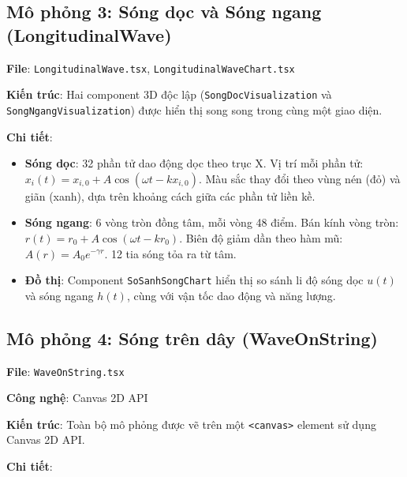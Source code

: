 \subsection{Mô phỏng 3: Sóng dọc và Sóng ngang (LongitudinalWave)}

\textbf{File}: \texttt{LongitudinalWave.tsx}, \texttt{LongitudinalWaveChart.tsx}

\textbf{Kiến trúc}: Hai component 3D độc lập (\texttt{SongDocVisualization} và \texttt{SongNgangVisualization}) được hiển thị song song trong cùng một giao diện.

\textbf{Chi tiết}:

\begin{itemize}
    \item \textbf{Sóng dọc}: 32 phần tử dao động dọc theo trục X. Vị trí mỗi phần tử: $x_i(t) = x_{i,0} + A\cos(\omega t - k x_{i,0})$. Màu sắc thay đổi theo vùng nén (đỏ) và giãn (xanh), dựa trên khoảng cách giữa các phần tử liền kề.
    
    \item \textbf{Sóng ngang}: 6 vòng tròn đồng tâm, mỗi vòng 48 điểm. Bán kính vòng tròn: $r(t) = r_0 + A\cos(\omega t - k r_0)$. Biên độ giảm dần theo hàm mũ: $A(r) = A_0 e^{-\gamma r}$. 12 tia sóng tỏa ra từ tâm.
    
    \item \textbf{Đồ thị}: Component \texttt{SoSanhSongChart} hiển thị so sánh li độ sóng dọc $u(t)$ và sóng ngang $h(t)$, cùng với vận tốc dao động và năng lượng.
\end{itemize}

\subsection{Mô phỏng 4: Sóng trên dây (WaveOnString)}

\textbf{File}: \texttt{WaveOnString.tsx}

\textbf{Công nghệ}: Canvas 2D API

\textbf{Kiến trúc}: Toàn bộ mô phỏng được vẽ trên một \texttt{<canvas>} element sử dụng Canvas 2D API.

\textbf{Chi tiết}:

